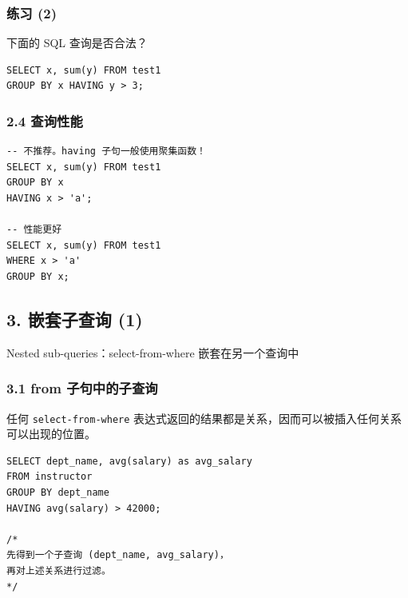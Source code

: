 \documentclass[aspectratio=169, 14pt]{beamer}
\begin{document}
\begin{frame}[fragile]
	\frametitle{练习 (2) {\large {}} }

	下面的 SQL 查询是否合法？

	\begin{verbatim} 
SELECT x, sum(y) FROM test1 
GROUP BY x HAVING y > 3;  
\end{verbatim}

	\pause

\end{frame}


\begin{frame}[fragile]
	\frametitle{2.4 查询性能}
	\begin{verbatim} 
-- 不推荐。having 子句一般使用聚集函数！
SELECT x, sum(y) FROM test1 
GROUP BY x 
HAVING x > 'a';

-- 性能更好
SELECT x, sum(y) FROM test1 
WHERE x > 'a'
GROUP BY x;
    \end{verbatim}



\end{frame}

\begin{frame}[fragile]
	\section{\textcolor{darkmidnightblue}{3. 嵌套子查询 (1)}}
	Nested sub-queries：\alert{select-from-where} 嵌套在另一个查询中

\end{frame}

\begin{frame}[fragile]
	\frametitle{3.1 from 子句中的子查询}
	任何 \texttt{select-from-where} 表达式返回的结果都是关系，因而可以被插入任何关系可以出现的位置。

	\begin{verbatim}
SELECT dept_name, avg(salary) as avg_salary
FROM instructor
GROUP BY dept_name
HAVING avg(salary) > 42000;

/*
先得到一个子查询 (dept_name, avg_salary)，
再对上述关系进行过滤。
*/
    \end{verbatim}

\end{frame}
\end{document}
